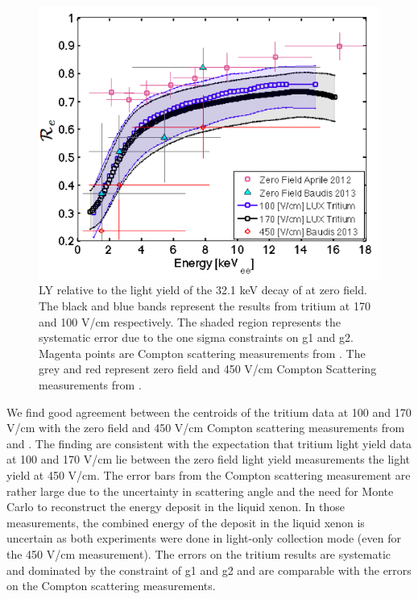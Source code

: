  \begin{figure}[h!]\centering
 \includegraphics[width=150mm]{Chapter_Flucs/Figures/LYQY_iter1/Re_fig.png}
\caption{LY relative to the light yield of the 32.1 keV decay of \KrCal at zero field. The black and blue bands represent the results from tritium at 170 and 100 V/cm respectively. The shaded region represents the systematic error due to the one sigma constraints on g1 and g2.  Magenta points are Compton scattering measurements from \cite{Aprile_LY}. The grey and red represent zero field and 450 V/cm Compton Scattering measurements from \cite{Baudis}. }
\label{fig:Re}
\end{figure}

We find good agreement between the centroids of the tritium data at 100 and 170 V/cm with the zero field and 450 V/cm Compton scattering measurements from \cite{Aprile_LY} and \cite{Baudis}. The finding are consistent with the expectation that tritium light yield data at 100 and 170 V/cm lie between the zero field light yield measurements the light yield at 450 V/cm. The error bars from the Compton scattering measurement are rather large due to the uncertainty in scattering angle and the need for Monte Carlo to reconstruct the energy deposit in the liquid xenon. In those measurements, the combined energy of the deposit in the liquid xenon is uncertain as both experiments were done in light-only collection mode \cite{Aprile_LY}  \cite{Baudis} (even for the 450 V/cm measurement). The errors on the tritium results are systematic and dominated by the constraint of g1 and g2 and are comparable with the errors on the Compton scattering measurements. 


